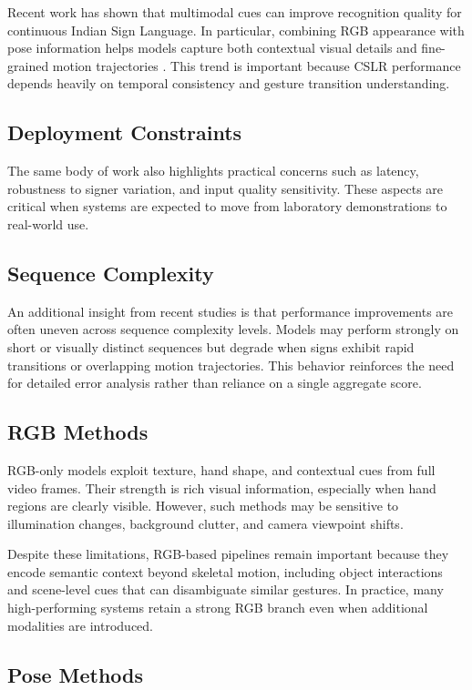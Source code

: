 Recent work has shown that multimodal cues can improve recognition quality for continuous Indian Sign Language. In particular, combining RGB appearance with pose information helps models capture both contextual visual details and fine-grained motion trajectories \citep{geetha2025toward}. This trend is important because CSLR performance depends heavily on temporal consistency and gesture transition understanding.

\subsection{Deployment Constraints}

The same body of work also highlights practical concerns such as latency, robustness to signer variation, and input quality sensitivity. These aspects are critical when systems are expected to move from laboratory demonstrations to real-world use.

\subsection{Sequence Complexity}

An additional insight from recent studies is that performance improvements are often uneven across sequence complexity levels. Models may perform strongly on short or visually distinct sequences but degrade when signs exhibit rapid transitions or overlapping motion trajectories. This behavior reinforces the need for detailed error analysis rather than reliance on a single aggregate score.

\subsection{RGB Methods}

RGB-only models exploit texture, hand shape, and contextual cues from full video frames. Their strength is rich visual information, especially when hand regions are clearly visible. However, such methods may be sensitive to illumination changes, background clutter, and camera viewpoint shifts.

Despite these limitations, RGB-based pipelines remain important because they encode semantic context beyond skeletal motion, including object interactions and scene-level cues that can disambiguate similar gestures. In practice, many high-performing systems retain a strong RGB branch even when additional modalities are introduced.

\subsection{Pose Methods}

